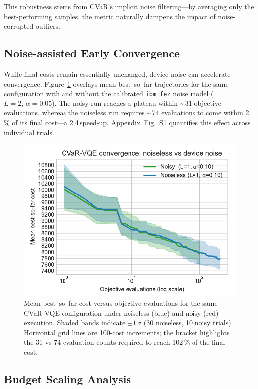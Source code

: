 This robustness stems from CVaR's implicit noise filtering—by averaging only 
the best-performing samples, the metric naturally dampens the impact of 
noise-corrupted outliers.

\subsection{Noise-assisted Early Convergence}

While final costs remain essentially unchanged, device noise can 
accelerate convergence. Figure~\ref{fig:learning_curves_noise} overlays 
mean best–so–far trajectories for the same configuration with and without 
the calibrated \texttt{ibm\_fez} noise model (\(L=2,\,\alpha=0.05\)). The 
noisy run reaches a plateau within \textasciitilde{}\,31 objective evaluations, whereas the noiseless 
run requires \textasciitilde{}\,74 evaluations to come within 2\,\% of its final cost—a 
2.4\,\times speed-up. Appendix~Fig.~S1 quantifies this effect across individual 
trials.

\begin{figure}[h]
  \centering
  \includegraphics[width=.7\linewidth]{fig/learning_curves_noise.pdf}
  \caption{Mean best–so–far cost versus objective evaluations for the same
           CVaR-VQE configuration under noiseless (blue) and noisy (red) execution.
           Shaded bands indicate $\pm1\,\sigma$ (30 noiseless, 10 noisy trials).
           Horizontal grid lines are 100-cost increments; the bracket highlights
           the 31 vs 74 evaluation counts required to reach 102\,\% of the final
           cost.}
  \label{fig:learning_curves_noise}
\end{figure}

\subsection{Budget Scaling Analysis}

